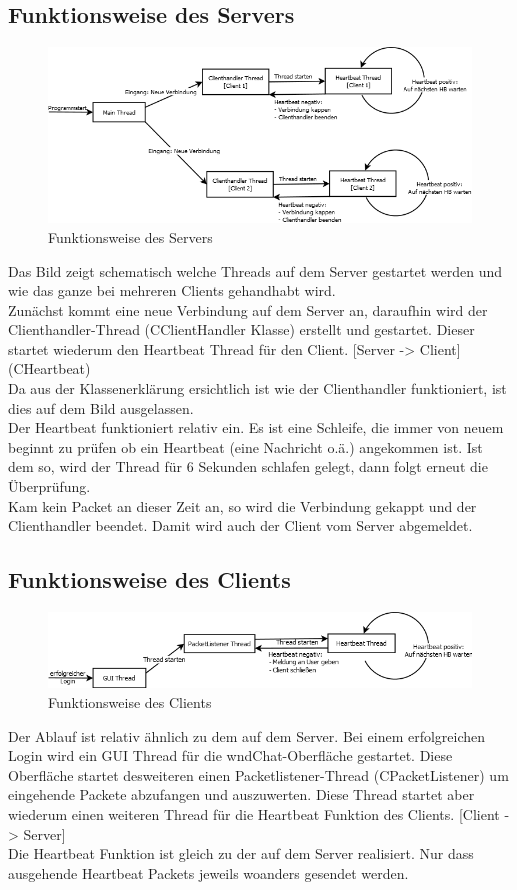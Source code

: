 \documentclass[a4paper,12pt]{scrartcl}
\begin{document}
\subsection{Funktionsweise des Servers}
\begin{figure}[h]
	\centering
	\includegraphics[width=17cm]{Bilder/Serverablauf.png}
	\caption{Funktionsweise des Servers}
\end{figure}
Das Bild zeigt schematisch welche Threads auf dem Server gestartet werden und wie das ganze bei mehreren Clients gehandhabt wird.\\
Zunächst kommt eine neue Verbindung auf dem Server an, daraufhin wird der Clienthandler-Thread (CClientHandler Klasse) erstellt und gestartet. Dieser startet wiederum den Heartbeat Thread für den Client. [Server -> Client] (CHeartbeat)\\
Da aus der Klassenerklärung ersichtlich ist wie der Clienthandler funktioniert, ist dies auf dem Bild ausgelassen.\\
Der Heartbeat funktioniert relativ ein. Es ist eine Schleife, die immer von neuem beginnt zu prüfen ob ein Heartbeat (eine Nachricht o.ä.) angekommen ist. Ist dem so, wird der Thread für 6 Sekunden schlafen gelegt, dann folgt erneut die Überprüfung.\\
Kam kein Packet an dieser Zeit an, so wird die Verbindung gekappt und der Clienthandler beendet. Damit wird auch der Client vom Server abgemeldet.
\clearpage

\subsection{Funktionsweise des Clients}
\begin{figure}[h]
	\centering
	\includegraphics[width=17cm]{Bilder/Clientablauf.png}
	\caption{Funktionsweise des Clients}
\end{figure}
Der Ablauf ist relativ ähnlich zu dem auf dem Server. Bei einem erfolgreichen Login wird ein GUI Thread für die wndChat-Oberfläche gestartet. Diese Oberfläche startet desweiteren einen Packetlistener-Thread (CPacketListener) um eingehende Packete abzufangen und auszuwerten. Diese Thread startet aber wiederum einen weiteren Thread für die Heartbeat Funktion des Clients. [Client -> Server]\\
Die Heartbeat Funktion ist gleich zu der auf dem Server realisiert. Nur dass ausgehende Heartbeat Packets jeweils woanders gesendet werden.
\clearpage
\end{document}
